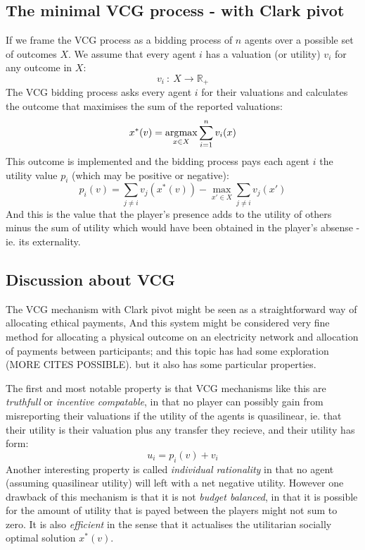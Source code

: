 \subsection{The minimal VCG process - with Clark pivot}
If we frame the VCG process as a bidding process of $n$ agents over a possible set of outcomes $X$.
We assume that every agent $i$ has a valuation (or utility) $v_i$ for any outcome in $X$:
$$ v_i~:~X\rightarrow \mathbb{R}_+ $$
The VCG bidding process asks every agent $i$ for their valuations and calculates the outcome that maximises the sum of the reported valuations:
$$ x^*(v) = \operatorname*{\arg\!\max}_{x\in X}\sum_{i=1}^{n}v_i(x) $$
This outcome is implemented and the bidding process pays each agent $i$ the utility value $p_i$ (which may be positive or negative):
$$ p_i(v)=\sum_{j\ne i}v_j(x^*(v)) - \max_{x'\in X}\sum_{j\ne i}v_j(x') $$
And this is the value that the player's presence adds to the utility of others minus the sum of utility which would have been obtained in the player's absense - ie. its externality.

\subsection{Discussion about VCG}
The VCG mechanism with Clark pivot might be seen as a straightforward way of allocating ethical payments,
And this system might be considered very fine method for allocating a physical outcome on an electricity network and allocation of payments between participants; and this topic has had some exploration \cite{SESSA2017189, 8264596} (MORE CITES POSSIBLE).
 but it also has some particular properties.

The first and most notable property is that VCG mechanisms like this are \textit{truthfull} or \textit{incentive compatable}, in that no player can possibly gain from misreporting their valuations \cite{roberts1979characterization, Lavi2008}
if the utility of the agents is quasilinear, ie. that their utility is their valuation plus any transfer they recieve, and their utility has form:
$$ u_i = p_i(v)+v_i $$
Another interesting property is called \textit{individual rationality} in that no agent (assuming quasilinear utility) will left with a net negative utility.
However one drawback of this mechanism is that it is not \textit{budget balanced}, in that it is possible for the amount of utility that is payed between the players might not sum to zero.
It is also \textit{efficient} in the sense that it actualises the utilitarian socially optimal solution $x^*(v)$.

